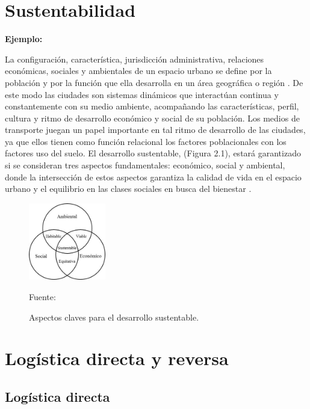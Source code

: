 \section{Sustentabilidad}

{\bf Ejemplo:}\par

La configuración, característica, jurisdicción administrativa, relaciones económicas, sociales y ambientales de un espacio urbano se define por la población y por la función que ella desarrolla en un área geográfica o región \citep{Bugliarello}. De este modo las ciudades son sistemas dinámicos que interactúan continua y constantemente con su medio ambiente, acompañando las características, perfil, cultura y ritmo de desarrollo económico y social de su población. Los medios de transporte juegan un papel importante en tal ritmo de desarrollo de las ciudades, ya que ellos tienen como función relacional los factores poblacionales con los factores uso del suelo.  
\vskip 1cm
El desarrollo sustentable, (Figura 2.1), estará garantizado si se consideran tres aspectos fundamentales: económico, social y ambiental, donde la intersección de estos aspectos garantiza la calidad de vida en el espacio urbano y el equilibrio en las clases sociales en busca del bienestar \citep{Tanguay}.

\begin{figure}[ht]
\begin{center}
\includegraphics[width=0.3\textwidth]{image/Figura2}
\end{center}
\begin{center}
\vskip -0.5cm
\caption{\small{Aspectos claves para el desarrollo sustentable.}}
{\small{Fuente: \cite{Tanguay}}}
\end{center}
\end{figure}

\section{Logística directa y reversa}

\subsection{Logística directa}

